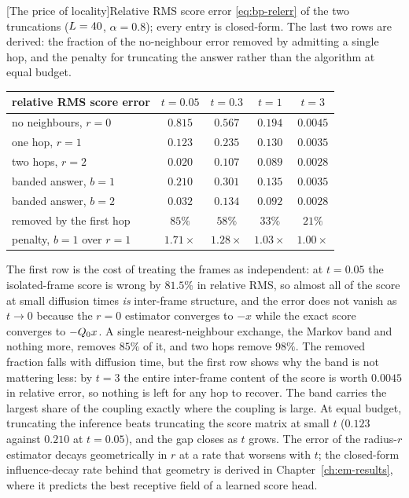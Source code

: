 \begin{center}
\begin{minipage}{\linewidth}\centering
{}[The price of locality]{Relative RMS score error
\eqref{eq:bp-relerr} of the two truncations ($L = 40$, $\alpha = 0.8$);
every entry is closed-form. The last two rows are derived: the fraction of the
no-neighbour error removed by admitting a single hop, and the penalty for
truncating the answer rather than the algorithm at equal budget.}
\label{tab:g-truncation}
\small
\begin{tabular}{@{}lcccc@{}}
\toprule
relative RMS score error & $t = 0.05$ & $t = 0.3$ & $t = 1$ & $t = 3$ \\
\midrule
no neighbours, $r = 0$        & $0.815$ & $0.567$ & $0.194$ & $0.0045$ \\
one hop, $r = 1$              & $0.123$ & $0.235$ & $0.130$ & $0.0035$ \\
two hops, $r = 2$             & $0.020$ & $0.107$ & $0.089$ & $0.0028$ \\
\addlinespace
banded answer, $b = 1$        & $0.210$ & $0.301$ & $0.135$ & $0.0035$ \\
banded answer, $b = 2$        & $0.032$ & $0.134$ & $0.092$ & $0.0028$ \\
\midrule
removed by the first hop      & $85\%$  & $58\%$  & $33\%$  & $21\%$ \\
penalty, $b{=}1$ over $r{=}1$ & $1.71\times$ & $1.28\times$ & $1.03\times$ & $1.00\times$ \\
\bottomrule
\end{tabular}
\end{minipage}
\end{center}

The first row is the cost of treating the frames as independent: at
$t = 0.05$ the isolated-frame score is wrong by $81.5\%$ in relative RMS, so
almost all of the score at small diffusion times \emph{is} inter-frame
structure, and the error does not vanish as $t \to 0$ because the $r = 0$
estimator converges to $-x$ while the exact score converges to $-Q_0 x$. A
single nearest-neighbour exchange, the Markov band and nothing more, removes
$85\%$ of it, and two hops remove $98\%$. The removed fraction falls with
diffusion time, but the first row shows why the band is not mattering less:
by $t = 3$ the entire inter-frame content of the score is worth $0.0045$ in
relative error, so nothing is left for any hop to recover. The band carries
the largest share of the coupling exactly where the coupling is large. At
equal budget, truncating the inference beats truncating the score matrix at
small $t$ ($0.123$ against $0.210$ at $t = 0.05$), and the gap closes as $t$
grows. The error of the radius-$r$ estimator decays geometrically in $r$ at
a rate that worsens with $t$; the closed-form influence-decay rate behind
that geometry is derived in Chapter~\ref{ch:em-results}, where it predicts
the best receptive field of a learned score head.

